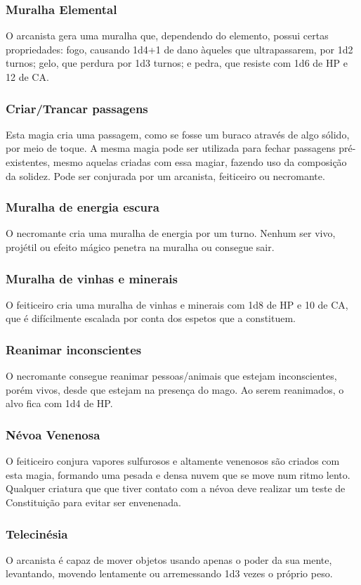 \documentclass[10pt,twoside,twocolumn]{book}
\begin{document}
\subsubsection*{Muralha Elemental}
O arcanista gera uma muralha que, dependendo do elemento, possui certas propriedades: fogo, causando 1d4+1 de dano àqueles que ultrapassarem, por 1d2 turnos; gelo, que perdura por 1d3 turnos; e pedra, que resiste com 1d6 de HP e 12 de CA.
\subsubsection*{Criar/Trancar passagens}
Esta magia cria uma passagem, como se fosse um buraco através de algo sólido, por meio de toque. A mesma magia pode ser utilizada para fechar passagens pré-existentes, mesmo aquelas criadas com essa magiar, fazendo uso da composição da solidez. Pode ser conjurada por um arcanista, feiticeiro ou necromante.
\subsubsection*{Muralha de energia escura}
O necromante cria uma muralha de energia por um turno. Nenhum ser vivo, projétil ou efeito mágico penetra na muralha ou consegue sair.
\subsubsection*{Muralha de vinhas e minerais}
O feiticeiro cria uma muralha de vinhas e minerais com 1d8 de HP e 10 de CA, que é difícilmente escalada por conta dos espetos que a constituem.
\subsubsection*{Reanimar inconscientes}
O necromante consegue reanimar pessoas/animais que estejam inconscientes, porém vivos, desde que estejam na presença do mago. Ao serem reanimados, o alvo fica com 1d4 de HP.
\subsubsection*{Névoa Venenosa}
O feiticeiro conjura vapores sulfurosos e altamente venenosos são criados com esta magia, formando uma pesada e densa nuvem que se move num ritmo lento. Qualquer criatura que que tiver contato com a névoa deve realizar um teste de Constituição para evitar ser envenenada.
\subsubsection*{Telecinésia}
O arcanista é capaz de mover objetos usando apenas o poder da sua mente, levantando, movendo lentamente ou arremessando 1d3 vezes o próprio peso.
\end{document}
